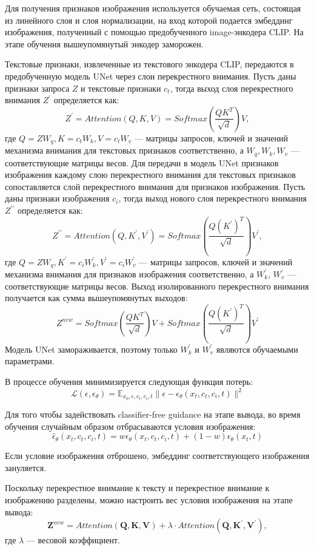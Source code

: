 \documentclass{article}
\begin{document}
Для получения признаков изображения используется обучаемая сеть, состоящая из линейного слоя и слоя нормализации, на вход которой подается эмбеддинг изображения, полученный с помощью предобученного image-энкодера CLIP. На этапе обучения вышеупомянутый энкодер заморожен.

Текстовые признаки, извлеченные из текстового энкодера CLIP, передаются в предобученную модель UNet через слои перекрестного внимания. Пусть даны признаки запроса $Z$ и текстовые признаки $c_t$, тогда выход слоя перекрестного внимания $Z^{\prime}$ определяется как: $$Z^{\prime} = Attention(Q, K, V) = Softmax(\frac{QK^T}{\sqrt{d}})V,$$ где $Q = Z W_q, K = c_t W_k, V = c_t W_v$ --- матрицы запросов, ключей и значений механизма внимания для текстовых признаков соответственно, а $W_q, W_k, W_v$ --- соответствующие матрицы весов. Для передачи в модель UNet признаков изображения каждому слою перекрестного внимания для текстовых признаков сопоставляется слой перекрестного внимания для признаков изображения. Пусть даны признаки изображения $c_i$, тогда выход нового слоя перекрестного внимания $Z^{\prime\prime}$ определяется как: $$Z^{\prime\prime} = Attention(Q, K^{\prime}, V^{\prime}) = Softmax(\frac{Q(K^{\prime})^T}{\sqrt{d}})V^{\prime},$$ где $Q = Z W_q, K^{\prime} = c_i {W}^{\prime}_k, V^{\prime} = c_i {W}^{\prime}_v$ --- матрицы запросов, ключей и значений механизма внимания для признаков изображения соответственно, а ${W}^{\prime}_k$, ${W}^{\prime}_v$ --- соответствующие матрицы весов. Выход изолированного перекрестного внимания получается как сумма вышеупомянутых выходов: $$Z^{new} = Softmax(\frac{QK^T}{\sqrt{d}})V + Softmax(\frac{Q(K^{\prime})^T}{\sqrt{d}})V^{\prime}$$ Модель UNet замораживается, поэтому только ${W}^{\prime}_k$ и ${W}^{\prime}_v$ являются обучаемыми параметрами.

В процессе обучения минимизируется следующая функция потерь: $$ \mathcal{L}(\epsilon, \epsilon_{\theta}) = \mathbb{E}_{x_0, \epsilon, c_t, c_i, t} \|\epsilon - \epsilon_{\theta}(x_t, c_t, c_i, t)\|^2$$

Для того чтобы задействовать classifier-free guidance на этапе вывода, во время обучения случайным образом отбрасываются условия изображения: $$\hat{\epsilon}_{\theta}(x_t, c_t, c_i, t) = w\epsilon_{\theta}(x_t, c_t, c_i, t) + (1-w)\epsilon_{\theta}(x_t, t)$$

Если условие изображения отброшено, эмбеддинг соответствующего изображения зануляется. 

Поскольку перекрестное внимание к тексту и перекрестное внимание к изображению разделены, можно настроить вес условия изображения на этапе вывода: $$\mathbf{Z}^{new} = Attention(\mathbf{Q}, \mathbf{K}, \mathbf{V}) + \lambda \cdot Attention(\mathbf{Q}, \mathbf{K}^{\prime}, \mathbf{V}^{\prime}),$$ где $\lambda$ --- весовой коэффициент. 
\end{document}
